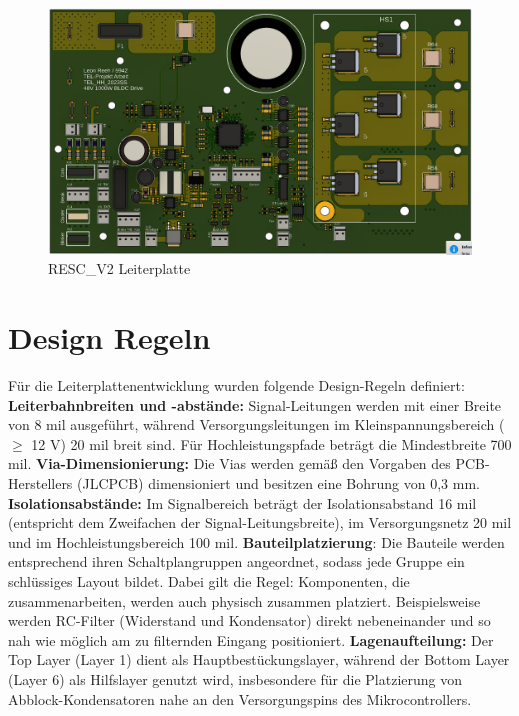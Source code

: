 \documentclass[paper=a4,11pt]{scrreprt}
\begin{document}
\begin{figure}[ht]
\begin{center}
\includegraphics[width=14cm]{Bilder/PCB.PNG}
\caption{RESC\_V2 Leiterplatte}
\label{pcb}
\end{center}
\end{figure}
\newpage
\section{Design Regeln}
Für die Leiterplattenentwicklung wurden folgende Design-Regeln definiert:
\textbf{Leiterbahnbreiten und -abstände:} Signal-Leitungen werden mit einer Breite von 8 mil ausgeführt, während Versorgungsleitungen im Kleinspannungsbereich ($\geq$ 12 V) 20 mil breit sind. Für Hochleistungspfade beträgt die Mindestbreite 700 mil.
\textbf{Via-Dimensionierung:} Die Vias werden gemäß den Vorgaben des PCB-Herstellers (JLCPCB) dimensioniert und besitzen eine Bohrung von 0,3 mm.
\textbf{Isolationsabstände:} Im Signalbereich beträgt der Isolationsabstand 16 mil (entspricht dem Zweifachen der Signal-Leitungsbreite), im Versorgungsnetz 20 mil und im Hochleistungsbereich 100 mil.
\textbf{Bauteilplatzierung}: Die Bauteile werden entsprechend ihren Schaltplangruppen angeordnet, sodass jede Gruppe ein schlüssiges Layout bildet. Dabei gilt die Regel: Komponenten, die zusammenarbeiten, werden auch physisch zusammen platziert. Beispielsweise werden RC-Filter (Widerstand und Kondensator) direkt nebeneinander und so nah wie möglich am zu filternden Eingang positioniert.
\textbf{Lagenaufteilung:} Der Top Layer (Layer 1) dient als Hauptbestückungslayer, während der Bottom Layer (Layer 6) als Hilfslayer genutzt wird, insbesondere für die Platzierung von Abblock-Kondensatoren nahe an den Versorgungspins des Mikrocontrollers.
\end{document}
